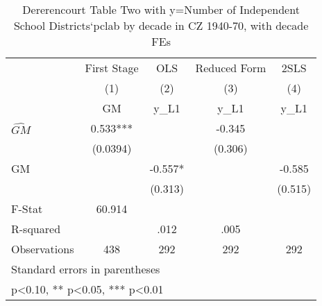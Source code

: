 \begin{table}[htbp]\centering
\def\sym#1{\ifmmode^{#1}\else\(^{#1}\)\fi}
\caption{Dererencourt Table Two with y=Number of Independent School Districts`pclab by decade in CZ 1940-70, with decade FEs}
\begin{tabular}{l*{4}{c}}
\toprule
                    & First Stage   &         OLS   &Reduced Form   &        2SLS   \\
                    &\multicolumn{1}{c}{(1)}&\multicolumn{1}{c}{(2)}&\multicolumn{1}{c}{(3)}&\multicolumn{1}{c}{(4)}\\
                    &\multicolumn{1}{c}{GM}&\multicolumn{1}{c}{y\_L1}&\multicolumn{1}{c}{y\_L1}&\multicolumn{1}{c}{y\_L1}\\
\midrule
$\hat{GM}$          &       0.533***&               &      -0.345   &               \\
                    &    (0.0394)   &               &     (0.306)   &               \\
\addlinespace
GM                  &               &      -0.557*  &               &      -0.585   \\
                    &               &     (0.313)   &               &     (0.515)   \\
\midrule
F-Stat              &      60.914   &               &               &               \\
R-squared           &               &        .012   &        .005   &               \\
Observations        &         438   &         292   &         292   &         292   \\
\bottomrule
\multicolumn{5}{l}{\footnotesize Standard errors in parentheses}\\
\multicolumn{5}{l}{\footnotesize * p<0.10, ** p<0.05, *** p<0.01}\\
\end{tabular}
\end{table}
